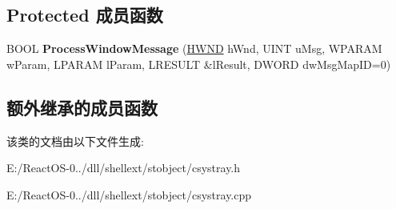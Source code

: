 \subsection*{Protected 成员函数}
\begin{DoxyCompactItemize}
\item 
\mbox{\label{class_c_sys_tray_a0d1ad0b38d72edd8ff9dae9652e96c1c}} 
B\+O\+OL {\bfseries Process\+Window\+Message} (\hyperlink{interfacevoid}{H\+W\+ND} h\+Wnd, U\+I\+NT u\+Msg, W\+P\+A\+R\+AM w\+Param, L\+P\+A\+R\+AM l\+Param, L\+R\+E\+S\+U\+LT \&l\+Result, D\+W\+O\+RD dw\+Msg\+Map\+ID=0)
\end{DoxyCompactItemize}
\subsection*{额外继承的成员函数}


该类的文档由以下文件生成\+:\begin{DoxyCompactItemize}
\item 
E\+:/\+React\+O\+S-\/0../dll/shellext/stobject/csystray.\+h\item 
E\+:/\+React\+O\+S-\/0../dll/shellext/stobject/csystray.\+cpp\end{DoxyCompactItemize}
